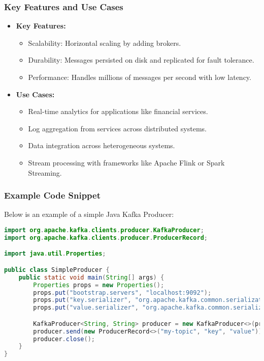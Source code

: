\documentclass[aspectratio=169]{beamer}
\begin{document}
\begin{frame}[fragile]
    \frametitle{Key Features and Use Cases}
    \begin{itemize}
        \item \textbf{Key Features:}
        \begin{itemize}
            \item Scalability: Horizontal scaling by adding brokers.
            \item Durability: Messages persisted on disk and replicated for fault tolerance.
            \item Performance: Handles millions of messages per second with low latency.
        \end{itemize}
        \item \textbf{Use Cases:}
        \begin{itemize}
            \item Real-time analytics for applications like financial services.
            \item Log aggregation from services across distributed systems.
            \item Data integration across heterogeneous systems.
            \item Stream processing with frameworks like Apache Flink or Spark Streaming.
        \end{itemize}
    \end{itemize}
\end{frame}

\begin{frame}[fragile]
    \frametitle{Example Code Snippet}
    Below is an example of a simple Java Kafka Producer:
    \begin{lstlisting}[language=Java]
import org.apache.kafka.clients.producer.KafkaProducer;
import org.apache.kafka.clients.producer.ProducerRecord;

import java.util.Properties;

public class SimpleProducer {
    public static void main(String[] args) {
        Properties props = new Properties();
        props.put("bootstrap.servers", "localhost:9092");
        props.put("key.serializer", "org.apache.kafka.common.serialization.StringSerializer");
        props.put("value.serializer", "org.apache.kafka.common.serialization.StringSerializer");

        KafkaProducer<String, String> producer = new KafkaProducer<>(props);
        producer.send(new ProducerRecord<>("my-topic", "key", "value"));
        producer.close();
    }
}
    \end{lstlisting}
\end{frame}
\end{document}
